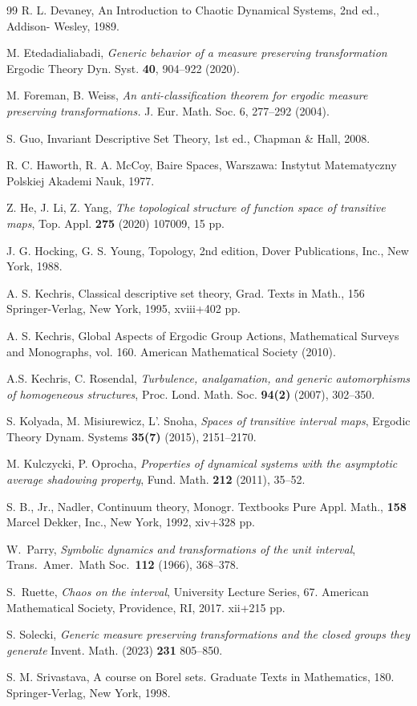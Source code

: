 \documentclass[12pt, a4paper]{amsart}
\newcommand{\?}{{\bf ???}}
\begin{document}
\begin{thebibliography}{99}
 R. L. Devaney, An Introduction to Chaotic Dynamical Systems, 2nd ed., Addison- Wesley, 1989.

  M. Etedadialiabadi, {\it Generic behavior of a measure preserving transformation} Ergodic
Theory Dyn. Syst. {\bf 40}, 904--922 (2020).

 M. Foreman, B. Weiss, {\it An anti-classification theorem for ergodic measure preserving
transformations.} J. Eur. Math. Soc. 6, 277--292 (2004).

 S. Guo, Invariant Descriptive Set Theory, 1st ed., Chapman \& Hall, 2008.

 R. C. Haworth,  R. A. McCoy, Baire Spaces, Warszawa: Instytut Matematyczny Polskiej Akademi Nauk, 1977.

  Z. He, J. Li, Z. Yang, {\it The topological structure of function space of transitive maps}, Top. Appl. {\bf 275} (2020) 107009, 15 pp.

 J. G. Hocking, G. S. Young, Topology, 2nd edition, Dover Publications, Inc., New York, 1988.


 A. S. Kechris, Classical descriptive set theory, Grad. Texts in Math., 156
Springer-Verlag, New York, 1995, xviii+402 pp.

  A. S. Kechris,  Global Aspects of Ergodic Group Actions, Mathematical Surveys and Monographs, vol. 160. American Mathematical Society (2010).

 A.S. Kechris, C. Rosendal, \textit{Turbulence, analgamation, and generic automorphisms of homogeneous structures}, Proc. Lond.
Math. Soc. \textbf{94(2)} (2007), 302--350.

 S. Kolyada, M. Misiurewicz, L'. Snoha, {\it Spaces of transitive interval maps}, Ergodic Theory Dynam. Systems {\bf 35(7)} (2015),  2151--2170.

 M. Kulczycki, P. Oprocha, {\it Properties of dynamical systems with the asymptotic average shadowing property}, Fund. Math. {\bf 212} (2011), 35--52.

 S. B., Jr., Nadler, Continuum theory, Monogr. Textbooks Pure Appl. Math., {\bf 158}
Marcel Dekker, Inc., New York, 1992, xiv+328 pp.

 W.\ Parry, {\it Symbolic dynamics and transformations of the unit interval}, Trans.\ Amer.\ Math Soc.\ \textbf{112} (1966), 368--378.

 S.\ Ruette, {\it  Chaos on the interval}, University Lecture Series, 67. American Mathematical Society, Providence, RI, 2017. xii+215 pp.

 S. Solecki,  {\it Generic measure preserving transformations and the closed groups they generate} Invent. Math. (2023) {\bf 231} 805--850.

 S. M. Srivastava, A course on Borel sets. Graduate Texts in Mathematics, 180. Springer-Verlag, New York, 1998. 



\end{thebibliography}
\end{document}
